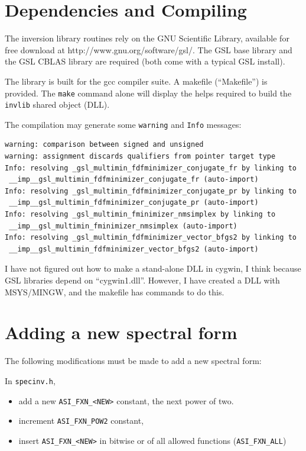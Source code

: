 \documentclass{article}    %
\begin{document}
\section{Dependencies and Compiling}

The inversion library routines rely on the GNU Scientific Library,
available for free download at http://www.gnu.org/software/gsl/. The
GSL base library and the GSL CBLAS library are required (both come
with a typical GSL install).

The library is built for the gcc compiler suite. A makefile
(``Makefile'') is provided. The \verb|make| command alone will display
the helps required to build the \verb|invlib| shared object (DLL).

The compilation may generate some \verb|warning| and \verb|Info| messages:
\begin{verbatim}
warning: comparison between signed and unsigned
warning: assignment discards qualifiers from pointer target type
Info: resolving _gsl_multimin_fdfminimizer_conjugate_fr by linking to
 __imp__gsl_multimin_fdfminimizer_conjugate_fr (auto-import)
Info: resolving _gsl_multimin_fdfminimizer_conjugate_pr by linking to
 __imp__gsl_multimin_fdfminimizer_conjugate_pr (auto-import)
Info: resolving _gsl_multimin_fminimizer_nmsimplex by linking to
 __imp__gsl_multimin_fminimizer_nmsimplex (auto-import)
Info: resolving _gsl_multimin_fdfminimizer_vector_bfgs2 by linking to
 __imp__gsl_multimin_fdfminimizer_vector_bfgs2 (auto-import)
\end{verbatim}

I have not figured out how to make a stand-alone DLL in cygwin, I
think because GSL libraries depend on ``cygwin1.dll''. However, I have
created a DLL with MSYS/MINGW, and the makefile has commands to do
this.


\appendix
\section{Adding a new spectral form}
\label{secAddingSpectrum}

The following modifications must be made to add a new spectral form:

In \verb|specinv.h|, 
\begin{itemize}
\item add a new \verb|ASI_FXN_<NEW>| constant, the next power of two.
\item increment \verb|ASI_FXN_POW2| constant,
\item insert \verb|ASI_FXN_<NEW>| in bitwise or of all allowed functions (\verb|ASI_FXN_ALL|)
\end{itemize}
\end{document}
